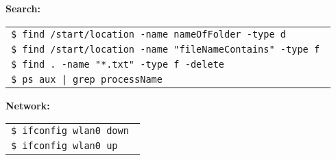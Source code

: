 \documentclass[10pt,landscape]{article}
\begin{document}
\begin{multicols}{3}
\vspace{0.7em}
\textbf{Search:}\\
\begin{tabular}{l}
\hspace{1ex} \texttt{\$ find /start/location -name nameOfFolder -type d }\\
\hspace{1ex} \texttt{\$ find /start/location -name "fileNameContains" -type f }\\
\hspace{1ex} \texttt{\$ find . -name "*.txt" -type f -delete }\\
\hspace{1ex} \texttt{\$ ps aux | grep processName }\\
\end{tabular}

\vspace{0.7em}
\textbf{Network:}\\
\begin{tabular}{l}
\hspace{1ex} \texttt{\$ ifconfig wlan0 down }\\
\hspace{1ex} \texttt{\$ ifconfig wlan0 up }\\
\end{tabular}

\vfill

\end{multicols}
 
\end{document}
